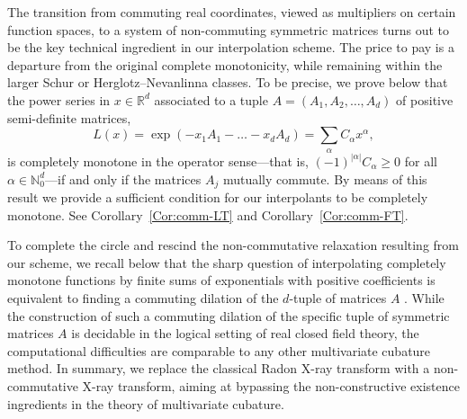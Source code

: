 \documentclass[11pt,reqno]{amsart}
\theoremstyle{plain}
\theoremstyle{definition}
\numberwithin{equation}{section}
\begin{document}
The transition from commuting real coordinates, viewed as multipliers on certain function spaces, to a system of non-commuting symmetric matrices turns out to be the key technical ingredient in our interpolation scheme. The price to pay is a departure from the original complete monotonicity, while remaining within the larger Schur or Herglotz–Nevanlinna classes. To be precise, we prove below that the power series in $x \in \mathbb{R}^d$ associated to a tuple $A = (A_1, A_2, \ldots, A_d)$ of positive semi-definite matrices,
$$
L(x) = \exp(-x_1 A_1 - \ldots - x_d A_d) = \sum_\alpha C_\alpha x^\alpha,
$$
is completely monotone in the operator sense—that is, $(-1)^{|\alpha|} C_\alpha \geq 0$ for all $\alpha \in \mathbb{N}_0^d$—if and only if the matrices $A_j$ mutually commute. By means of this result we provide a sufficient condition for our interpolants to be completely monotone. See Corollary~\ref{Cor:comm-LT} and Corollary~\ref{Cor:comm-FT}. 


To complete the circle and rescind the non-commutative relaxation resulting from our scheme, we recall below that the sharp question of
interpolating completely monotone functions by finite sums of exponentials with positive coefficients is equivalent to finding a commuting dilation of the $d$-tuple of matrices $A$ \cite{Dilcub1,Dilcub2}.
While the construction of such a commuting dilation of the specific tuple of symmetric matrices $A$ is decidable in the logical setting of real closed field theory, the computational difficulties
are comparable to any other multivariate cubature method. In summary, we replace the classical Radon X-ray transform with a non-commutative X-ray transform, aiming at bypassing the non-constructive existence ingredients in the theory of multivariate cubature.
\end{document}
